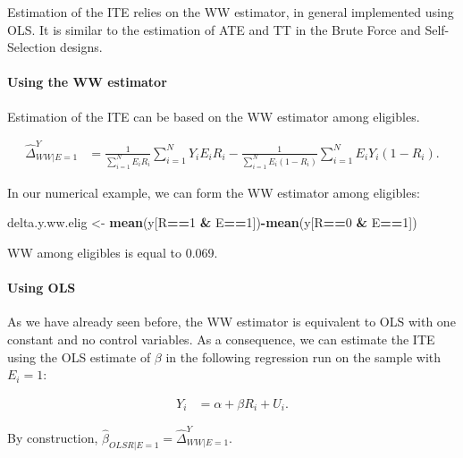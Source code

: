 \documentclass[]{book}
\newenvironment{Shaded}{\begin{snugshade}}{\end{snugshade}}
\newcommand{\KeywordTok}[1]{\textcolor[rgb]{0.13,0.29,0.53}{\textbf{#1}}}
\newcommand{\DecValTok}[1]{\textcolor[rgb]{0.00,0.00,0.81}{#1}}
\newcommand{\StringTok}[1]{\textcolor[rgb]{0.31,0.60,0.02}{#1}}
\newcommand{\OperatorTok}[1]{\textcolor[rgb]{0.81,0.36,0.00}{\textbf{#1}}}
\newcommand{\NormalTok}[1]{#1}
\let\oldparagraph\paragraph
\renewcommand{\paragraph}[1]{\oldparagraph{#1}\mbox{}}
\theoremstyle{definition}
\theoremstyle{definition}
\theoremstyle{definition}
\theoremstyle{remark}
\let\BeginKnitrBlock\begin \let\EndKnitrBlock\end
\begin{document}
Estimation of the ITE relies on the WW estimator, in general implemented
using OLS. It is similar to the estimation of ATE and TT in the Brute
Force and Self-Selection designs.

\paragraph{Using the WW estimator}\label{using-the-ww-estimator-2}

Estimation of the ITE can be based on the WW estimator among eligibles.

\begin{align*}
  \hat{\Delta}^Y_{WW|E=1} & = \frac{1}{\sum_{i=1}^N E_iR_i}\sum_{i=1}^N Y_iE_iR_i-\frac{1}{\sum_{i=1}^N E_i(1-R_i)}\sum_{i=1}^N E_iY_i(1-R_i).
\end{align*}

\BeginKnitrBlock{example}
\protect\hypertarget{exm:unnamed-chunk-94}{}{\label{exm:unnamed-chunk-94}
}In our numerical example, we can form the WW estimator among eligibles:
\EndKnitrBlock{example}

\begin{Shaded}
\begin{Highlighting}[]
\NormalTok{delta.y.ww.elig <-}\StringTok{ }\KeywordTok{mean}\NormalTok{(y[R}\OperatorTok{==}\DecValTok{1} \OperatorTok{&}\StringTok{ }\NormalTok{E}\OperatorTok{==}\DecValTok{1}\NormalTok{])}\OperatorTok{-}\KeywordTok{mean}\NormalTok{(y[R}\OperatorTok{==}\DecValTok{0} \OperatorTok{&}\StringTok{ }\NormalTok{E}\OperatorTok{==}\DecValTok{1}\NormalTok{])}
\end{Highlighting}
\end{Shaded}

WW among eligibles is equal to 0.069.

\paragraph{Using OLS}\label{using-ols-2}

As we have already seen before, the WW estimator is equivalent to OLS
with one constant and no control variables. As a consequence, we can
estimate the ITE using the OLS estimate of \(\beta\) in the following
regression run on the sample with \(E_i=1\):

\begin{align*}
  Y_i & = \alpha + \beta R_i + U_i.
\end{align*}

By construction, \(\hat{\beta}_{OLSR|E=1}=\hat{\Delta}^Y_{WW|E=1}\).
\end{document}

